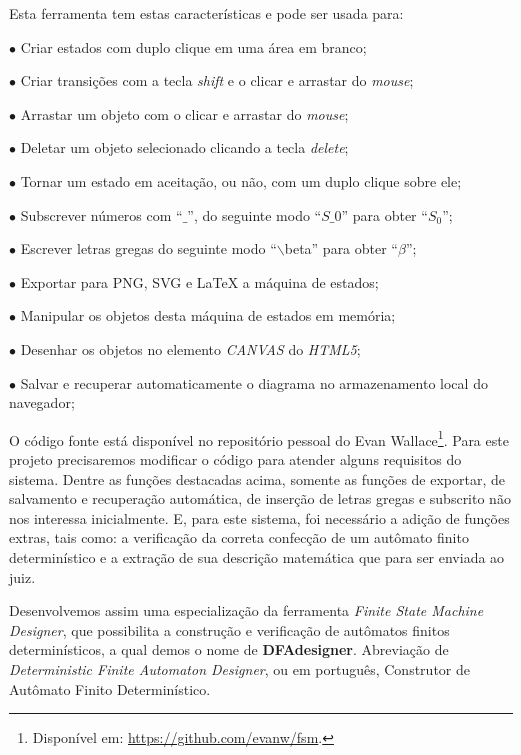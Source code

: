 \documentclass[
	12pt,				%
	openany,
	oneside,
	a4paper,			%
	english,			%
	brazil				%
	]{abntex2}
\begin{document}
  Esta ferramenta tem estas características e pode ser usada para:

\begin{alineas}
  \item[$\bullet$] Criar estados com duplo clique em uma área em branco;
  \item[$\bullet$] Criar transições com a tecla \textit{shift} e o clicar e arrastar do \textit{mouse};
  \item[$\bullet$] Arrastar um objeto com o clicar e arrastar do \textit{mouse};
  \item[$\bullet$] Deletar um objeto selecionado clicando a tecla \textit{delete};
  \item[$\bullet$] Tornar um estado em aceitação, ou não, com um duplo clique sobre ele;
  \item[$\bullet$] Subscrever números com “$\_$”, do seguinte modo “$S\_0$” para obter “$S_0$”;
  \item[$\bullet$] Escrever letras gregas do seguinte modo “$\backslash$beta” para obter “$\beta$”;
  \item[$\bullet$] Exportar para PNG, SVG e \LaTeX\xspace a máquina de estados;
  \item[$\bullet$] Manipular os objetos desta máquina de estados em memória;
  \item[$\bullet$] Desenhar os objetos no elemento \textit{CANVAS} do \textit{HTML5};
  \item[$\bullet$] Salvar e recuperar automaticamente o diagrama no armazenamento local do navegador;
\end{alineas}

  O código fonte está disponível no repositório pessoal do Evan Wallace\footnote{Disponível em: \url{https://github.com/evanw/fsm}.}. Para este projeto precisaremos modificar o código para atender alguns requisitos do sistema. Dentre as funções destacadas acima, somente as funções de exportar, de salvamento e recuperação automática, de inserção de letras gregas e subscrito não nos interessa inicialmente. E, para este sistema, foi necessário a adição de funções extras, tais como: a verificação da correta confecção de um autômato finito determinístico e a extração de sua descrição matemática que para ser enviada ao juiz.

  Desenvolvemos assim uma especialização da ferramenta \textit{Finite State Machine Designer}, que possibilita a construção e verificação de autômatos finitos determinísticos, a qual demos o nome de \textbf{DFAdesigner}. Abreviação de \textit{Deterministic Finite Automaton Designer}, ou em português, Construtor de Autômato Finito Determinístico.
\end{document}

